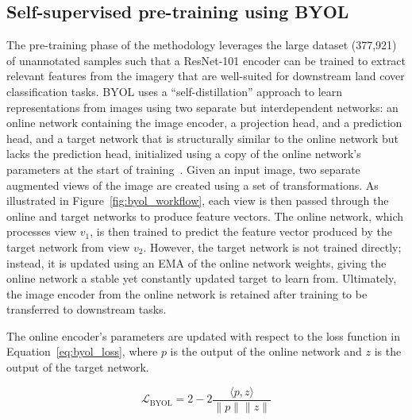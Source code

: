 \subsection{Self-supervised pre-training using BYOL}\label{sec:methodology:self_supervised_pretraining}

The pre-training phase of the methodology leverages the large dataset (377,921) of unannotated samples such that a ResNet-101 encoder can be trained to extract relevant features from the imagery that are well-suited for downstream land cover classification tasks.
BYOL uses a ``self-distillation'' approach to learn representations from images using two separate but interdependent networks: an online network containing the image encoder, a projection head, and a prediction head, and a target network that is structurally similar to the online network but lacks the prediction head, initialized using a copy of the online network's parameters at the start of training~\citep{grillBootstrapYourOwn2020}.
Given an input image, two separate augmented views of the image are created using a set of transformations.
As illustrated in Figure~\ref{fig:byol_workflow}, each view is then passed through the online and target networks to produce feature vectors.
The online network, which processes view \(v_1\), is then trained to predict the feature vector produced by the target network from view \(v_2\).
However, the target network is not trained directly; instead, it is updated using an EMA of the online network weights, giving the online network a stable yet constantly updated target to learn from.
Ultimately, the image encoder from the online network is retained after training to be transferred to downstream tasks.



The online encoder's parameters are updated with respect to the loss function in Equation~\ref{eq:byol_loss}, where \(p\) is the output of the online network and \(z\) is the output of the target network.

\begin{equation}\label{eq:byol_loss}
    \mathcal{L}_\text{BYOL} = 2 - 2 \frac{\langle p, z \rangle}{\|p\| \|z\|}
\end{equation}

